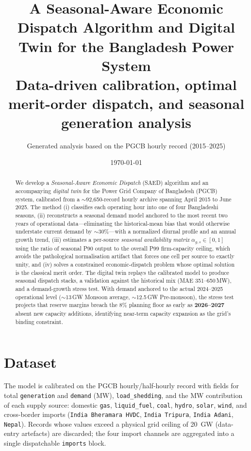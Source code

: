 \documentclass[11pt]{article}
\title{\textbf{A Seasonal-Aware Economic Dispatch Algorithm and Digital Twin
for the Bangladesh Power System}\\[2pt]
\large Data-driven calibration, optimal merit-order dispatch,
and seasonal generation analysis}
\author{Generated analysis based on the PGCB hourly record (2015--2025)}
\date{\today}
\begin{document}
\maketitle

\begin{abstract}
\noindent
We develop a \emph{Seasonal-Aware Economic Dispatch} (SAED) algorithm and an
accompanying \emph{digital twin} for the Power Grid Company of Bangladesh
(PGCB) system, calibrated from a $\sim$92{,}650-record hourly archive
spanning April 2015 to June 2025. The method (i) classifies each operating hour
into one of four Bangladeshi seasons, (ii) reconstructs a seasonal demand model
anchored to the most recent two years of operational data---eliminating the
historical-mean bias that would otherwise understate current demand by
$\sim$30\%---with a normalized diurnal profile and an annual growth trend,
(iii) estimates a per-source \emph{seasonal availability matrix}
$\alpha_{g,s}\in[0,1]$ using the ratio of seasonal P90 output to the overall
P99 firm-capacity ceiling, which avoids the pathological normalisation artifact
that forces one cell per source to exactly unity, and (iv) solves a constrained
economic-dispatch problem whose optimal solution is the classical merit order.
The digital twin replays the calibrated model to produce seasonal dispatch
stacks, a validation against the historical mix (MAE 351--650\,MW), and a
demand-growth stress test. With demand anchored to the actual 2024--2025
operational level ($\sim$13\,GW Monsoon average, $\sim$12.5\,GW Pre-monsoon),
the stress test projects that reserve margins breach the 8\% planning floor as
early as \textbf{2026--2027} absent new capacity additions, identifying near-term
capacity expansion as the grid's binding constraint.
\end{abstract}

\section{Dataset}
The model is calibrated on the PGCB hourly/half-hourly record with fields for
total \texttt{generation} and \texttt{demand} (MW), \texttt{load\_shedding}, and
the MW contribution of each supply source: domestic \texttt{gas},
\texttt{liquid\_fuel}, \texttt{coal}, \texttt{hydro}, \texttt{solar},
\texttt{wind}, and cross-border imports
(\texttt{India\,Bheramara\,HVDC}, \texttt{India\,Tripura}, \texttt{India\,Adani},
\texttt{Nepal}). Records whose values exceed a physical grid ceiling of
\SI{20}{GW} (data-entry artefacts) are discarded; the four import channels are
aggregated into a single dispatchable \texttt{imports} block.
\end{document}
